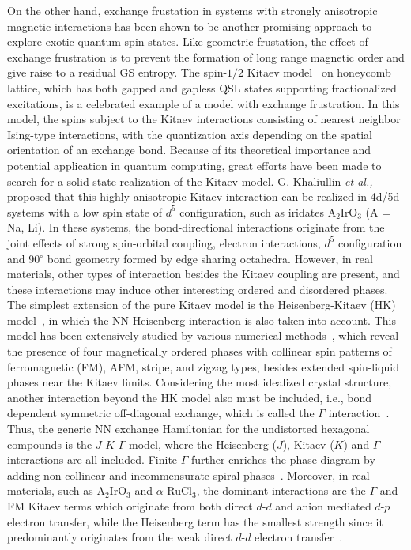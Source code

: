 \documentclass[aps,prb,reprint,amsfonts,amsmath,amssymb,showpacs,groupedaddress,superscriptaddress]{revtex4-1}
\begin{document}
On the other hand, exchange frustation in systems with strongly anisotropic magnetic interactions has been shown to be another promising approach to explore exotic quantum spin states. Like geometric frustation, the effect of exchange frustration is to prevent the formation of long range magnetic order and give raise to a residual GS entropy. The spin-$1/2$ Kitaev model~\cite{Kitaev2006} on honeycomb lattice, which has both gapped and gapless QSL states supporting fractionalized excitations, is a celebrated example of a model with exchange frustration. In this model, the spins subject to the Kitaev interactions consisting of nearest neighbor Ising-type interactions, with the quantization axis depending on the spatial orientation of an exchange bond. Because of its theoretical importance and potential application in quantum computing, great efforts have been made to search for a solid-state realization of the Kitaev model. G. Khaliullin \emph{et al.,}~\cite{Khaliullin2005,PhysRevLett.102.017205} proposed that this highly anisotropic Kitaev interaction can be realized in 4d/5d systems with a low spin state of $d^5$ configuration, such as iridates A$_2$IrO$_3$ (A = Na, Li). In these systems, the bond-directional interactions originate from the joint effects of strong spin-orbital coupling, electron interactions, $d^5$ configuration and 90$^\circ$ bond geometry formed by edge sharing octahedra. However, in real materials, other types of interaction besides the Kitaev coupling are present, and these interactions may induce other interesting ordered and disordered phases. The simplest extension of the pure Kitaev model is the Heisenberg-Kitaev (HK) model~\cite{PhysRevLett.105.027204,10.1146/annurev-conmatphys-033117-053934}, in which the NN Heisenberg interaction is also taken into account. This model has been extensively studied by various numerical methods~\cite{PhysRevLett.110.097204,PhysRevB.83.245104,PhysRevB.84.100406,PhysRevB.90.195102,PhysRevLett.119.157203}, which reveal the presence of four magnetically ordered phases with collinear spin patterns of ferromagnetic (FM), AFM, stripe, and zigzag types, besides extended spin-liquid phases near the Kitaev limits. Considering the most idealized crystal structure, another interaction beyond the HK model also must be included, i.e., bond dependent symmetric off-diagonal exchange, which is called the $\Gamma$ interaction~\cite{PhysRevLett.112.077204,PhysRevB.93.214431,PhysRevB.96.115103}. Thus, the generic NN exchange Hamiltonian for the undistorted hexagonal compounds is the $J$-$K$-$\Gamma$ model, where the Heisenberg ($J$), Kitaev ($K$) and $\Gamma$ interactions are all included. Finite $\Gamma$ further enriches the phase diagram by adding non-collinear and incommensurate spiral phases~\cite{PhysRevLett.112.077204,Winter_2017,10.1038/s42254-019-0038-2}. Moreover, in real materials, such as A$_2$IrO$_3$ and $\alpha$-RuCl$_{3}$, the dominant interactions are the $\Gamma$ and FM Kitaev terms which originate from both direct $d$-$d$ and anion mediated $d$-$p$ electron transfer, while the Heisenberg term has the smallest strength since it predominantly originates from the weak direct $d$-$d$ electron transfer~\cite{PhysRevB.93.214431,PhysRevB.96.115103}.
\end{document}
